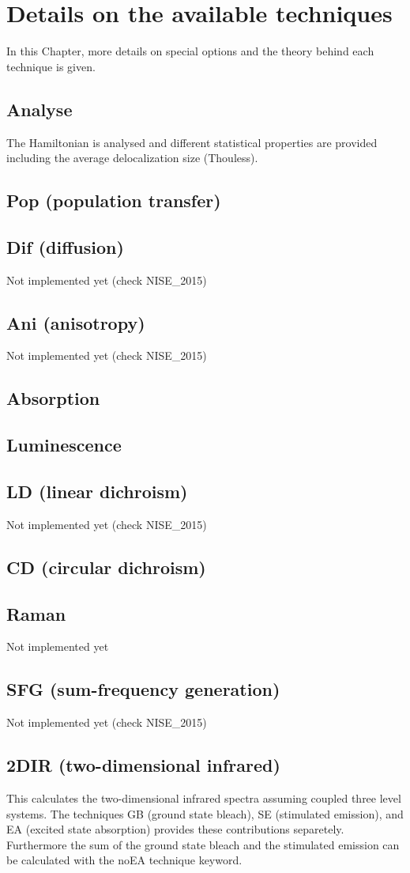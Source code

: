 \chapter{\label{chap:techniques}Details on the available techniques}
In this Chapter, more details on special options and the theory behind each technique is given.
\section{Analyse}
The Hamiltonian is analysed and different statistical properties are provided including the average delocalization size (Thouless).
\section{Pop (population transfer)}
\section{Dif (diffusion)}
Not implemented yet (check NISE\_2015)
\section{Ani (anisotropy)}
Not implemented yet (check NISE\_2015)
\section{Absorption}
\section{Luminescence}
\section{LD (linear dichroism)}
Not implemented yet (check NISE\_2015)
\section{CD (circular dichroism)}
\section{Raman}
Not implemented yet
\section{SFG (sum-frequency generation)}
Not implemented yet (check NISE\_2015)
\section{2DIR (two-dimensional infrared)}
This calculates the two-dimensional infrared spectra assuming coupled three level systems. The techniques GB (ground state bleach), SE (stimulated emission), and EA (excited state absorption) provides these contributions separetely. Furthermore the sum of the ground state bleach and the stimulated emission can be calculated with the noEA technique keyword. 
